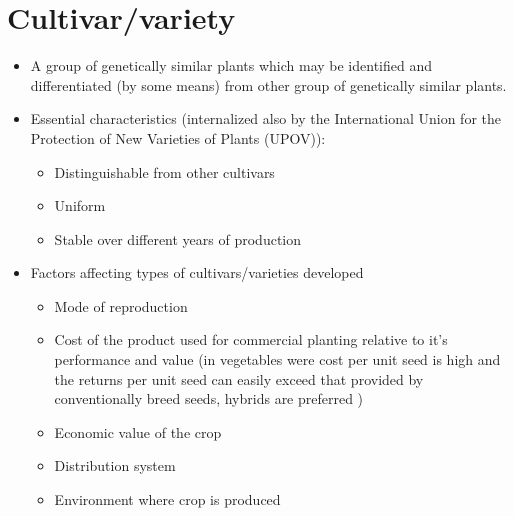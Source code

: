 \documentclass[11pt,ignorenonframetext,aspectratio=169]{beamer}
\providecommand{\tightlist}{%
  \setlength{\itemsep}{0pt}\setlength{\parskip}{0pt}}
\begin{document}
\hypertarget{cultivarvariety}{%
\section{Cultivar/variety}\label{cultivarvariety}}

\begin{frame}{}
\protect\hypertarget{section-1}{}
\begin{itemize}
\tightlist
\item
  A group of genetically similar plants which may be identified and
  differentiated (by some means) from other group of genetically similar
  plants.
\item
  Essential characteristics (internalized also by the International
  Union for the Protection of New Varieties of Plants (UPOV)):

  \begin{itemize}
  \tightlist
  \item
    Distinguishable from other cultivars
  \item
    Uniform
  \item
    Stable over different years of production
  \end{itemize}
\item
  Factors affecting types of cultivars/varieties developed

  \begin{itemize}
  \tightlist
  \item
    Mode of reproduction
  \item
    Cost of the product used for commercial planting relative to it's
    performance and value (in vegetables were cost per unit seed is high
    and the returns per unit seed can easily exceed that provided by
    conventionally breed seeds, hybrids are preferred )
  \item
    Economic value of the crop
  \item
    Distribution system
  \item
    Environment where crop is produced
  \end{itemize}
\end{itemize}
\end{frame}
\end{document}
